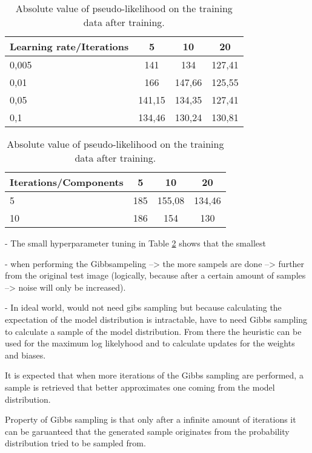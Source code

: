 \documentclass[a4paper,10pt]{article}
\begin{document}
\begin{table}[h]
	\begin{minipage}[t]{.5\linewidth}
		\centering
			\begin{tabular}{@{}l|ccc}
				\firsthline
				\textbf{Learning rate}/\textbf{Iterations}	&  5 & 10 & 20 \\ \midrule
				0,005&	141	&134&	127,41	\\ \hline
				0,01&	166&	147,66&	125,55\\ \hline
				0,05 &	141,15&	134,35&	127,41\\ \hline
				0,1 &	134,46&	130,24&	130,81\\\bottomrule
			\end{tabular}		
	\end{minipage}
	\begin{minipage}[t]{.5\linewidth}
		\centering
		\begin{tabular}{@{}l|ccc}
			\firsthline
			\textbf{Iterations}/\textbf{Components}	&  5 & 10 & 20 \\ \midrule
			5 &185	&155,08&	134,46	\\ \hline
			10&	186	&154&	130\\\bottomrule
		\end{tabular}
	\end{minipage} 
	\caption{Absolute value of pseudo-likelihood on the training data after training.}
	\label{tab:pseudo-likelihood}
\end{table}


- The small hyperparameter tuning in Table \ref{tab:pseudo-likelihood} shows that the smallest 

- when performing the Gibbsampeling --> the more sampels are done --> further from the original test image (logically, because after a certain amount of samples --> noise will only be increased).

- In ideal world, would not need gibs sampling but because calculating the expectation of the model distribution is intractable, have to need Gibbs sampling to calculate a sample of the model distribution. From there the heuristic can be used for the maximum log likelyhood  and to calculate updates for the weights and biases.

It is expected that when more iterations of the Gibbs sampling are performed, a sample is retrieved that better approximates one coming from the model distribution.

Property of Gibbs sampling is that only after a infinite amount of iterations it can be garuanteed that the generated sample originates from the probability distribution tried to be sampled from. 
\end{document}
